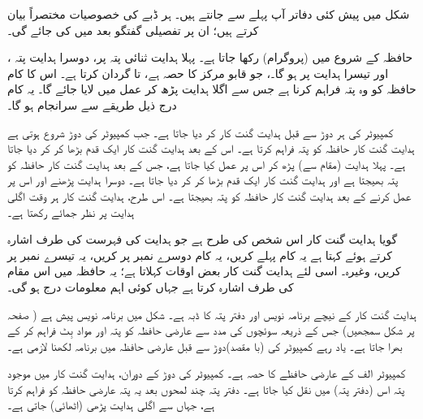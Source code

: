 شکل  میں پیش کئی دفاتر  آپ پہلے سے  جانتے ہیں۔  ہر ڈبے کی   خصوصیات مختصراً  بیان کرتے ہیں؛ ان پر تفصیلی گفتگو بعد میں کی جائے گی۔

حافظہ  کے شروع میں (پروگرام)  رکھا جاتا ہے۔ پہلا ہدایت ثنائی پتہ  پر، دوسرا ہدایت پتہ ، اور تیسرا ہدایت  پر ہو گا۔،  جو قابو مرکز کا حصہ ہے،  تا  گردان کرتا ہے۔ اس کا کام حافظہ کو وہ پتہ فراہم کرنا ہے جس سے اگلا ہدایت پڑھ کر عمل میں لایا جائے گا۔ یہ کام درج ذیل طریقے سے سرانجام ہو گا۔

کمپیوٹر کی ہر دوڑ  سے قبل ہدایت گنت کار     کر دیا جاتا ہے۔ جب کمپیوٹر کی دوڑ شروع  ہوتی ہے ہدایت گنت کار   حافظہ کو پتہ  فراہم کرتا ہے۔ اس کے بعد ہدایت گنت کار   ایک قدم بڑھا کر   کر دیا جاتا ہے۔ پہلا ہدایت (مقام  سے) پڑھ کر اس پر عمل کیا جاتا ہے، جس کے بعد ہدایت گنت کار حافظہ کو پتہ  بھیجتا ہے اور   ہدایت گنت کار ایک قدم بڑھا کر  کر دیا جاتا ہے۔ دوسرا ہدایت پڑھنے اور اس پر عمل کرنے کے بعد ہدایت گنت کار حافظہ کو  پتہ بھیجتا ہے۔ اس طرح، ہدایت گنت کار ہر وقت اگلی  ہدایت  پر نظر جمائے رکھتا ہے۔

گویا ہدایت گنت کار اس شخص کی طرح ہے جو ہدایت کی فہرست  کی طرف اشارہ کرتے ہوئے کہتا ہے یہ کام  پہلے کریں، یہ کام دوسرے نمبر پر کریں، یہ تیسرے نمبر پر کریں، وغیرہ۔ اسی لئے ہدایت گنت کار بعض اوقات  کہلاتا ہے؛ یہ حافظہ میں اس مقام کی طرف اشارہ کرتا ہے جہاں کوئی   اہم معلومات درج ہو گی۔

ہدایت گنت کار کے نیچے برنامہ نویس   اور دفتر پتہ کا  ڈبہ ہے۔ شکل  میں برنامہ نویس پیش ہے (     صفحہ  پر شکل  سمجھیں)   جس  کے ذریعہ سوئچوں  کی مدد سے   عارضی حافظہ کو   پتہ اور  مواد   بِٹ فراہم کر  کے بھرا جاتا ہے۔ یاد رہے کمپیوٹر کی  (با مقصد)دوڑ سے قبل عارضی حافظہ میں برنامہ  لکھنا لازمی ہے۔

   کمپیوٹر  الف کے عارضی حافظے کا حصہ ہے۔ کمپیوٹر  کی دوڑ کے دوران، ہدایت گنت کار  میں موجود پتہ  اس   (دفتر پتہ)     میں  نقل  کیا جاتا ہے۔  دفتر پتہ   چند لمحوں بعد یہ پتہ عارضی  حافظہ کو فراہم کرتا ہے، جہاں سے   اگلی ہدایت پڑھی (اٹھائی)  جاتی ہے۔

